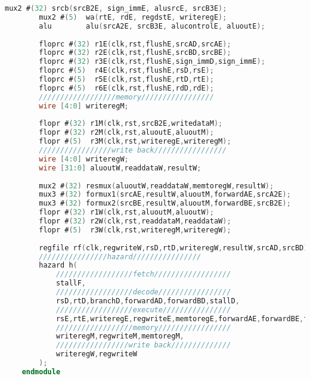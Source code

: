\begin{lstlisting}[language=Verilog]
        mux2 #(32) srcb(srcB2E, sign_immE, alusrcE, srcB3E);
        mux2 #(5)  wa(rtE, rdE, regdstE, writeregE);
        alu        alu(srcA2E, srcB3E, alucontrolE, aluoutE);
        
        floprc #(32) r1E(clk,rst,flushE,srcAD,srcAE);
        floprc #(32) r2E(clk,rst,flushE,srcBD,srcBE);
        floprc #(32) r3E(clk,rst,flushE,sign_immD,sign_immE);
        floprc #(5)  r4E(clk,rst,flushE,rsD,rsE);
        floprc #(5)  r5E(clk,rst,flushE,rtD,rtE);
        floprc #(5)  r6E(clk,rst,flushE,rdD,rdE);
        //////////////////memory/////////////////
        wire [4:0] writeregM;
        
        flopr #(32) r1M(clk,rst,srcB2E,writedataM);
        flopr #(32) r2M(clk,rst,aluoutE,aluoutM);
        flopr #(5)  r3M(clk,rst,writeregE,writeregM);
        /////////////////write back/////////////////
        wire [4:0] writeregW;
        wire [31:0] aluoutW,readdataW,resultW;
        
        mux2 #(32) resmux(aluoutW,readdataW,memtoregW,resultW);
        mux3 #(32) formux1(srcAE,resultW,aluoutM,forwardAE,srcA2E);
        mux3 #(32) formux2(srcBE,resultW,aluoutM,forwardBE,srcB2E);
        flopr #(32) r1W(clk,rst,aluoutM,aluoutW);
        flopr #(32) r2W(clk,rst,readdataM,readdataW);
        flopr #(5)  r3W(clk,rst,writeregM,writeregW);
        
        regfile rf(clk,regwriteW,rsD,rtD,writeregW,resultW,srcAD,srcBD);
        ////////////////hazard////////////////
        hazard h(
            //////////////////fetch//////////////////
            stallF,
            //////////////////decode/////////////////
            rsD,rtD,branchD,forwardAD,forwardBD,stallD,
            //////////////////execute////////////////
            rsE,rtE,writeregE,regwriteE,memtoregE,forwardAE,forwardBE,flushE,
            //////////////////memory/////////////////
            writeregM,regwriteM,memtoregM,
            /////////////////write back//////////////
            writeregW,regwriteW
        );
    endmodule
\end{lstlisting}

